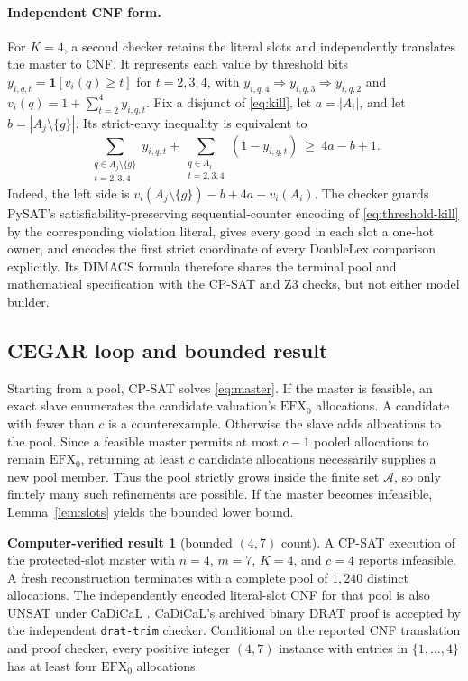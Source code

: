 \documentclass[11pt]{article}
\theoremstyle{plain}
\theoremstyle{definition}
\newtheorem{cverified}[theorem]{Computer-verified result}
\newcommand{\efxo}{\mathrm{EFX}_0}
\begin{document}
\paragraph{Independent CNF form.}
For $K=4$, a second checker retains the literal slots and independently
translates the master to CNF.  It represents each value by threshold bits
$y_{i,q,t}=\mathbf 1[v_i(q)\ge t]$ for $t=2,3,4$, with
$y_{i,q,4}\Rightarrow y_{i,q,3}\Rightarrow y_{i,q,2}$ and
$v_i(q)=1+\sum_{t=2}^4y_{i,q,t}$.  Fix a disjunct of
\eqref{eq:kill}, let $a=|A_i|$, and let
$b=|A_j\setminus\{g\}|$.  Its strict-envy inequality is equivalent to
\begin{equation}\label{eq:threshold-kill}
 \sum_{\substack{q\in A_j\setminus\{g\}\\t=2,3,4}}y_{i,q,t}
 +\sum_{\substack{q\in A_i\\t=2,3,4}}(1-y_{i,q,t})
 \ \ge\ 4a-b+1.
\end{equation}
Indeed, the left side is
$v_i(A_j\setminus\{g\})-b+4a-v_i(A_i)$.
The checker guards PySAT's satisfiability-preserving sequential-counter
encoding \cite{PySAT,Sinz2005} of \eqref{eq:threshold-kill} by the corresponding
violation literal, gives every good in each slot a one-hot owner, and encodes
the first strict coordinate of every DoubleLex comparison explicitly.  Its
DIMACS formula therefore shares the terminal pool and mathematical
specification with the CP-SAT and Z3 checks, but not either model builder.

\subsection{CEGAR loop and bounded result}

Starting from a pool, CP-SAT solves \eqref{eq:master}.  If the master is
feasible, an exact slave enumerates the candidate valuation's $\efxo$
allocations.  A candidate with fewer than $c$ is a counterexample.  Otherwise
the slave adds allocations to the pool.  Since a feasible master permits at
most $c-1$ pooled allocations to remain $\efxo$, returning at least $c$
candidate allocations necessarily supplies a new pool member.  Thus the pool
strictly grows inside the finite set $\mathcal A$, so only finitely many such
refinements are possible.  If the master
becomes infeasible, Lemma~\ref{lem:slots} yields the bounded lower bound.

\begin{cverified}[bounded $(4,7)$ count]\label{cv:bounded}
A CP-SAT \cite{ORtools} execution of the protected-slot master with $n=4$,
$m=7$, $K=4$, and $c=4$ reports infeasible.  A fresh reconstruction terminates
with a complete pool of $1{,}240$ distinct allocations.  The independently
encoded literal-slot CNF for that pool is also UNSAT under CaDiCaL
\cite{CaDiCaL}.  CaDiCaL's archived binary DRAT proof is accepted by the
independent \texttt{drat-trim} checker.  Conditional on the reported CNF
translation and proof checker, every positive integer $(4,7)$ instance with
entries in $\{1,\ldots,4\}$ has at least four $\efxo$ allocations.
\end{cverified}
\end{document}
